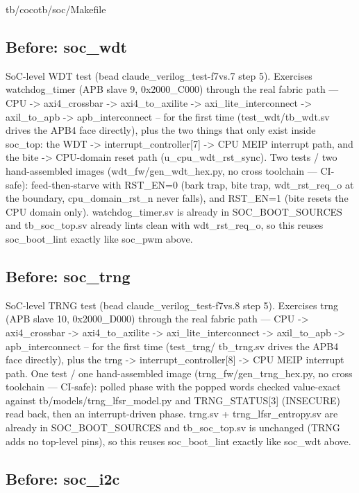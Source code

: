 \begin{relocated}{tb/cocotb/soc/Makefile}
\subsection*{Before: soc\_wdt}

\begin{textblock}
SoC-level WDT test (bead claude_verilog_test-f7vs.7 step 5). Exercises watchdog_timer
(APB slave 9, 0x2000_C000) through the real fabric path — CPU -> axi4_crossbar ->
axi4_to_axilite -> axi_lite_interconnect -> axil_to_apb -> apb_interconnect -- for the first
time (test_wdt/tb_wdt.sv drives the APB4 face directly), plus the two things that only exist
inside soc_top: the WDT -> interrupt_controller[7] -> CPU MEIP interrupt path, and the
bite -> CPU-domain reset path (u_cpu_wdt_rst_sync). Two tests / two hand-assembled images
(wdt_fw/gen_wdt_hex.py, no cross toolchain — CI-safe): feed-then-starve with RST_EN=0 (bark
trap, bite trap, wdt_rst_req_o at the boundary, cpu_domain_rst_n never falls), and RST_EN=1
(bite resets the CPU domain only). watchdog_timer.sv is already in SOC_BOOT_SOURCES and
tb_soc_top.sv already lints clean with wdt_rst_req_o, so this reuses soc_boot_lint exactly
like soc_pwm above.
\end{textblock}

\subsection*{Before: soc\_trng}

\begin{textblock}
SoC-level TRNG test (bead claude_verilog_test-f7vs.8 step 5). Exercises trng (APB slave 10,
0x2000_D000) through the real fabric path — CPU -> axi4_crossbar -> axi4_to_axilite ->
axi_lite_interconnect -> axil_to_apb -> apb_interconnect -- for the first time (test_trng/
tb_trng.sv drives the APB4 face directly), plus the trng -> interrupt_controller[8] -> CPU MEIP
interrupt path. One test / one hand-assembled image (trng_fw/gen_trng_hex.py, no cross
toolchain — CI-safe): polled phase with the popped words checked value-exact against
tb/models/trng_lfsr_model.py and TRNG_STATUS[3] (INSECURE) read back, then an interrupt-driven
phase. trng.sv + trng_lfsr_entropy.sv are already in SOC_BOOT_SOURCES and tb_soc_top.sv is
unchanged (TRNG adds no top-level pins), so this reuses soc_boot_lint exactly like soc_wdt above.
\end{textblock}

\subsection*{Before: soc\_i2c}


\end{relocated}
